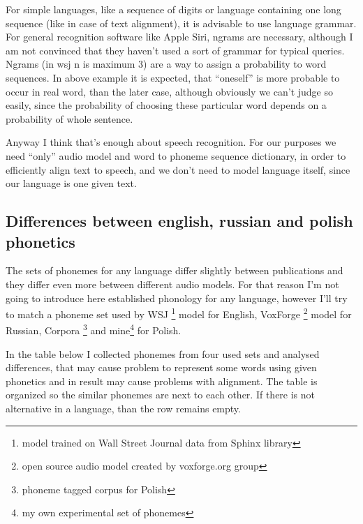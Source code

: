 \documentclass[12pt,a4paper,english]{article}
\begin{document}
For simple languages, like a sequence of digits or language containing one long sequence (like in case of text alignment), it is advisable to use language grammar. \newline
For general recognition software like Apple Siri, ngrams are necessary, although I am not convinced that they haven't used a sort of grammar for typical queries. \newline
Ngrams (in wsj n is maximum 3) are a way to assign a probability to word sequences. In above example it is expected, that “oneself” is more probable to occur in real word, than the later case, although obviously we can't judge so easily, since the probability of choosing these particular word depends on a probability of whole sentence. \newline

Anyway I think that's enough about speech recognition. \newline
For our purposes we need “only” audio model and word to phoneme sequence dictionary, in order to efficiently align text to speech, and we don't need to model language itself, since our language is one given text. \newline

\newpage
\subsection{Differences between english, russian and polish phonetics}

The sets of phonemes for any language differ slightly between publications and they differ even more between different audio models. For that reason I'm not going to introduce here established phonology for any language, however I'll try to match a phoneme set used by WSJ \footnote{model trained on Wall Street Journal data from Sphinx library} model for English, VoxForge \footnote{open source audio model created by voxforge.org group} model for Russian, Corpora \footnote{phoneme tagged corpus for Polish} and mine\footnote{my own experimental set of phonemes} for Polish. \newline

In the table below I collected phonemes from four used sets and analysed differences, that may cause problem to represent some words using given phonetics and in result may cause problems with alignment. The table is organized so the similar phonemes are next to each other. If there is not alternative in a language, than the row remains empty. \newline
\end{document}
